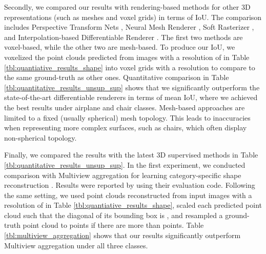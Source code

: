\documentclass[runningheads]{llncs}
\begin{document}
Secondly, we compared our results with rendering-based methods for other 3D representations (such as meshes and voxel grids) in terms of IoU. The comparison includes Perspective Transform Nets \cite{kato2020differentiable}, Neural Mesh Renderer \cite{kato2020differentiable}, Soft Rasterizer \cite{liu2019soft}, and Interpolation-based Differentiable Renderer \cite{NEURIPS2019_f5ac21cd}. The first two methods are voxel-based, while the other two are mesh-based. To produce our IoU, we voxelized the point clouds predicted from images with a resolution of  in Table \ref{tbl:quantiative_results_shape} into voxel grids with a resolution  to compare to the same ground-truth as other ones. Quantitative comparison in Table \ref{tbl:quantitative_results_unsup_sup} shows that we significantly outperform the state-of-the-art differentiable renderers in terms of mean IoU, where we achieved the best results under airplane and chair classes. Mesh-based approaches are limited to a fixed (usually spherical) mesh topology. This leads to inaccuracies when representing more complex surfaces, such as chairs, which often display non-spherical topology.

Finally, we compared the results with the latest 3D supervised methods in Table \ref{tbl:quantitative_results_unsup_sup}. In the first experiment, we conducted comparison with Multiview aggregation for learning category-specific shape reconstruction \cite{kato2020differentiable}. Results were reported by using their evaluation code. Following the same setting, we used point clouds reconstructed from input images with a resolution of  in Table \ref{tbl:quantiative_results_shape}, scaled each predicted point cloud such that the diagonal of its bounding box is , and resampled a ground-truth point cloud to  points if there are more than  points. Table \ref{tbl:multiview_aggregation} shows that our results significantly outperform Multiview aggregation under all three classes.

\begin{table}[h]
\centering
\caption{Chamfer's distance comparison with the latest supervised method Multiview aggregation.}  
   \label{tbl:multiview_aggregation}
\end{table}
\end{document}
